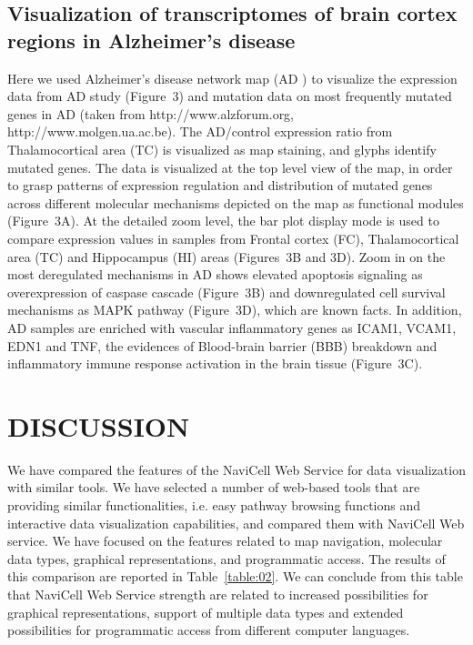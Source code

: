\documentclass[a4,center,fleqn]{NAR}
\begin{document}
\subsection{Visualization of transcriptomes of brain cortex regions in Alzheimer's disease}

Here we used Alzheimer's disease network map (AD \cite{Mizuno2012}) to visualize
the expression data from AD study \cite{hokama2013altered} (Figure~3) and mutation data on most frequently
mutated genes in AD (taken from http://www.alzforum.org,
http://www.molgen.ua.ac.be). The AD/control expression ratio from
Thalamocortical area (TC) is visualized as map staining, and glyphs identify
mutated genes. The data is visualized at the top level view of the map, in
order to grasp patterns of expression regulation and distribution of mutated
genes across different molecular mechanisms depicted on the map as functional
modules (Figure~3A). At the detailed zoom level, the bar plot display mode is
used to compare expression values in
samples from Frontal cortex (FC), Thalamocortical area (TC) and Hippocampus
(HI) areas (Figures~3B and 3D).  Zoom in on the most deregulated mechanisms in
AD shows elevated apoptosis signaling as overexpression of caspase cascade
(Figure~3B) and downregulated cell survival mechanisms as MAPK pathway (Figure~3D),
which are known facts. In addition, AD
samples are enriched with vascular inflammatory genes as ICAM1, VCAM1, EDN1 and
TNF, the evidences of Blood-brain barrier (BBB) breakdown and inflammatory
immune response activation in the brain tissue (Figure~3C).

\section{DISCUSSION}

We have compared the features of the NaviCell Web Service for data visualization
with similar tools. We have selected a number of web-based tools that are providing
similar functionalities, i.e. easy pathway browsing functions and interactive data
visualization capabilities, and compared them with NaviCell Web service. We have focused on the features
related to map navigation, molecular data types, graphical representations,
and programmatic access. The results of this comparison are reported in Table~\ref{table:02}.
We can conclude from this table that NaviCell Web Service strength are related to
increased possibilities for graphical representations, support of multiple
data types and extended possibilities for programmatic access from different
computer languages.
\end{document}
